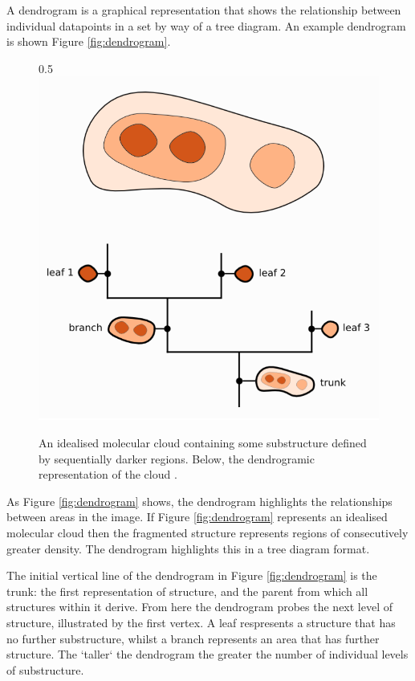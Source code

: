 \documentclass{report}
\begin{document}
A dendrogram is a graphical representation that shows the relationship between individual datapoints in a set by way of a tree diagram. An example dendrogram is shown Figure \ref{fig:dendrogram}.

\begin{figure}[h]{0.5\textwidth}
  \centering
  \includegraphics[scale=0.5]{../img/dendrogram}
  \caption[An idealised molecular cloud containing some substructure defined by sequentially darker regions. Below, the dendrogramic representation of the cloud \parencite{dendrogramimg}.]{An idealised molecular cloud containing some substructure defined by sequentially darker regions. Below, the dendrogramic representation of the cloud \parencite{dendrogramimg}.}
\end{figure}\label{fig:dendrogram}

As Figure \ref{fig:dendrogram} shows, the dendrogram highlights the relationships between areas in the image. If Figure \ref{fig:dendrogram} represents an idealised molecular cloud then the fragmented structure represents regions of consecutively greater density. The dendrogram highlights this in a tree diagram format.

The initial vertical line of the dendrogram in Figure \ref{fig:dendrogram} is the trunk: the first representation of structure, and the parent from which all structures within it derive. From here the dendrogram probes the next level of structure, illustrated by the first vertex. A leaf respresents a structure that has no further substructure, whilst a branch represents an area that has further structure. The `taller` the dendrogram the greater the number of individual levels of substructure.
\end{document}
